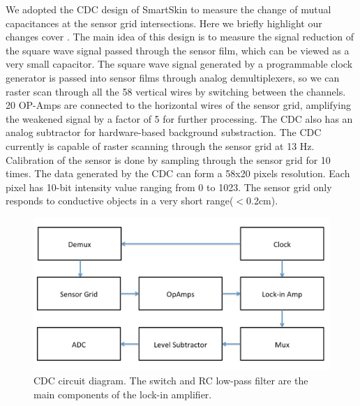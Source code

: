 We adopted the CDC design of SmartSkin \cite{smartskin} to measure the change of mutual capacitances at the sensor grid intersections. Here we briefly highlight our changes cover \cite{smartskin}. 
The main idea of this design is to measure the signal reduction of the square wave signal passed through the sensor film, which can be viewed as a very small capacitor.
The square wave signal generated by a programmable clock generator is passed into sensor films through analog demultiplexers, so we can raster scan through all the 58 vertical wires by switching between the channels.
20 OP-Amps are connected to the horizontal wires of the sensor grid, amplifying the weakened signal by a factor of 5 for further processing.
The CDC also has an analog subtractor for hardware-based background substraction.
The CDC currently is capable of raster scanning through the sensor grid at 13 Hz.
Calibration of the sensor is done by sampling through the sensor grid for 10 times.
The data generated by the CDC can form a 58x20 pixels resolution. Each pixel has 10-bit intensity value ranging from 0 to 1023.
The sensor grid only responds to conductive objects in a very short range($<$0.2cm).

\begin{figure}[!h]
\centering
\includegraphics[width=0.8\columnwidth]{figures/figure2.png}
\caption{CDC circuit diagram. The switch and RC low-pass filter are the main components of the lock-in amplifier.}
\label{fig:figure2}
\end{figure}

